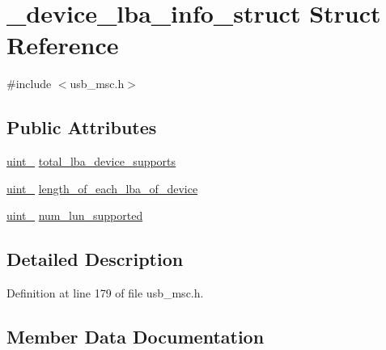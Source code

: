 \hypertarget{struct__device__lba__info__struct}{}\section{\+\_\+device\+\_\+lba\+\_\+info\+\_\+struct Struct Reference}
\label{struct__device__lba__info__struct}


{\ttfamily \#include $<$usb\+\_\+msc.\+h$>$}

\subsection*{Public Attributes}
\begin{DoxyCompactItemize}
\item 
\hyperlink{types_8h_a5532400b872b4aa84e54335bf458a318}{uint\+\_} \hyperlink{struct__device__lba__info__struct_a9d222becf4aee43e8069564b711482ed}{total\+\_\+lba\+\_\+device\+\_\+supports}
\item 
\hyperlink{types_8h_a5532400b872b4aa84e54335bf458a318}{uint\+\_} \hyperlink{struct__device__lba__info__struct_a7d8325efedba22b20ce7ad4097d6f745}{length\+\_\+of\+\_\+each\+\_\+lba\+\_\+of\+\_\+device}
\item 
\hyperlink{types_8h_ad3209046c23f739a81581c10a4be7d92}{uint\+\_} \hyperlink{struct__device__lba__info__struct_a783c732f2cab51adf42234e5604e19ca}{num\+\_\+lun\+\_\+supported}
\end{DoxyCompactItemize}


\subsection{Detailed Description}


Definition at line 179 of file usb\+\_\+msc.\+h.



\subsection{Member Data Documentation}
